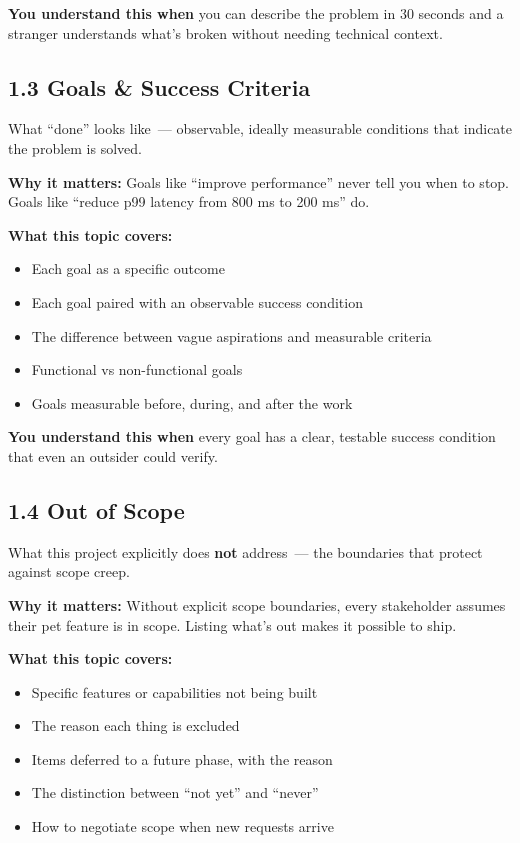 \noindent{}\textbf{You understand this when} you can describe the problem in 30 seconds and a stranger understands what's broken without needing technical context.

\subsection*{1.3 Goals \& Success Criteria}\label{project-planning-guide:13-goals--success-criteria}

What ``done'' looks like~--- observable, ideally measurable conditions that indicate the problem is solved.

\textbf{Why it matters:} Goals like ``improve performance'' never tell you when to stop. Goals like ``reduce p99 latency from 800 ms to 200 ms'' do.

\textbf{What this topic covers:}

\begin{itemize}
\tightlist
\item
  Each goal as a specific outcome
\item
  Each goal paired with an observable success condition
\item
  The difference between vague aspirations and measurable criteria
\item
  Functional vs non-functional goals
\item
  Goals measurable before, during, and after the work
\end{itemize}

\noindent{}\textbf{You understand this when} every goal has a clear, testable success condition that even an outsider could verify.

\subsection*{1.4 Out of Scope}\label{project-planning-guide:14-out-of-scope}

What this project explicitly does \textbf{not} address~--- the boundaries that protect against scope creep.

\textbf{Why it matters:} Without explicit scope boundaries, every stakeholder assumes their pet feature is in scope. Listing what's out makes it possible to ship.

\textbf{What this topic covers:}

\begin{itemize}
\tightlist
\item
  Specific features or capabilities not being built
\item
  The reason each thing is excluded
\item
  Items deferred to a future phase, with the reason
\item
  The distinction between ``not yet'' and ``never''
\item
  How to negotiate scope when new requests arrive
\end{itemize}

